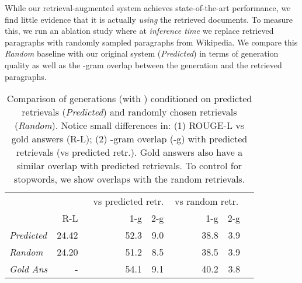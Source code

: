 \documentclass[11pt]{article}
\begin{document}
While our retrieval-augmented system achieves state-of-the-art performance, we find little evidence that it is actually \emph{using} the retrieved documents. To measure this, we run an ablation study where at \emph{inference time} we replace retrieved paragraphs with randomly sampled paragraphs from Wikipedia. We compare this \emph{Random} baseline with our original system (\emph{Predicted}) in terms of generation quality as well as the -gram overlap between the generation and the retrieved paragraphs.\\

\begin{table}[t]
\small
\begin{center}
\begin{tabular}{ lrrrrrr } 
 \toprule
  &  & \multicolumn{2}{r}{vs predicted retr.} & \multicolumn{2}{c}{vs random retr.} \\
 & R-L & ~~~~~~~~~1-g & 2-g & ~~~~~~~1-g & 2-g \\
\midrule
\emph{Predicted}  & 24.42 & 52.3 & 9.0 & 38.8 & 3.9 \\
\emph{Random} & 24.20 & 51.2 & 8.5 & 38.5 & 3.9 \\
\midrule
\emph{Gold Ans} & - & 54.1 & 9.1 & 40.2 & 3.8 \\
\bottomrule
\end{tabular}
\end{center}
\caption{Comparison of generations (with ) conditioned on predicted retrievals (\emph{Predicted}) and randomly chosen retrievals (\emph{Random}). Notice small differences in: (1) ROUGE-L vs gold answers (R-L); (2) -gram overlap (-g) with predicted retrievals (vs predicted retr.). Gold answers also have a similar overlap with predicted retrievals. To control for stopwords, we show overlaps with the random retrievals.}
\label{tab:pred_vs_random_all}
\end{table}
\end{document}
